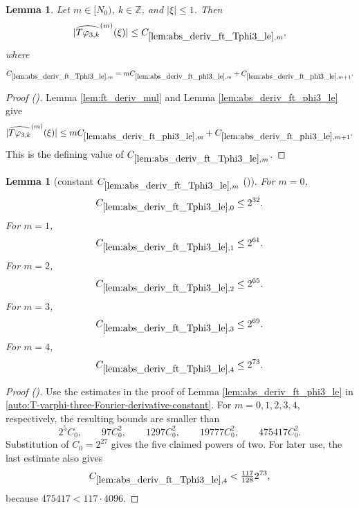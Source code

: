 \documentclass[12pt,reqno]{amsart}
\newcommand{\auto}{{({\tiny\faCar})}}
\theoremstyle{plain}
\newtheorem{lemma}[theorem]{Lemma}
\numberwithin{equation}{section}
\theoremstyle{remark}
\newcommand{\using}[1]{}
\newcommand{\Z}{{\mathbb Z}}
\begin{document}
\begin{lemma}\label{lem:abs_deriv_ft_Tphi3_le}\using{lem:ft_deriv_mul}\using{lem:abs_deriv_ft_phi3_le}
Let $m\in[N_0)$, $k\in\Z$, and $|\xi|\le1$. Then
\begin{equation}\label{auto:T-varphi-three-Fourier-derivative-bound}
|\widehat{T\varphi_{3,k}}^{(m)}(\xi)|
\le C_{\ref{lem:abs_deriv_ft_Tphi3_le},m},
\end{equation}
where
\begin{equation}\label{auto:T-varphi-three-Fourier-derivative-constant}
C_{\ref{lem:abs_deriv_ft_Tphi3_le},m}
=mC_{\ref{lem:abs_deriv_ft_phi3_le},m}
+C_{\ref{lem:abs_deriv_ft_phi3_le},m+1}.
\end{equation}
\end{lemma}
\begin{proof}[Proof \auto]
Lemma \ref{lem:ft_deriv_mul} and Lemma \ref{lem:abs_deriv_ft_phi3_le} give
\[
|\widehat{T\varphi_{3,k}}^{(m)}(\xi)|
\le
mC_{\ref{lem:abs_deriv_ft_phi3_le},m}
+C_{\ref{lem:abs_deriv_ft_phi3_le},m+1}.
\]
This is the defining value of $C_{\ref{lem:abs_deriv_ft_Tphi3_le},m}$.
\end{proof}

\begin{lemma}[constant $C_{\ref{lem:abs_deriv_ft_Tphi3_le},m}$ \auto]\label{constant T phi three derivative}\using{lem:abs_deriv_ft_phi3_le}\using{lem:abs_deriv_ft_Tphi3_le}
For $m=0$,
\begin{equation}\label{constant T phi three derivative bound}
C_{\ref{lem:abs_deriv_ft_Tphi3_le},0}\le2^{32}.
\end{equation}
For $m=1$,
\begin{equation}\label{auto:constant-T-phi-three-derivative-one}
C_{\ref{lem:abs_deriv_ft_Tphi3_le},1}\le2^{61}.
\end{equation}
For $m=2$,
\begin{equation}\label{auto:constant-T-phi-three-derivative-two}
C_{\ref{lem:abs_deriv_ft_Tphi3_le},2}\le2^{65}.
\end{equation}
For $m=3$,
\begin{equation}\label{auto:constant-T-phi-three-derivative-three}
C_{\ref{lem:abs_deriv_ft_Tphi3_le},3}\le2^{69}.
\end{equation}
For $m=4$,
\begin{equation}\label{auto:constant-T-phi-three-derivative-four}
C_{\ref{lem:abs_deriv_ft_Tphi3_le},4}\le2^{73}.
\end{equation}
\end{lemma}
\begin{proof}[Proof \auto]
Use the estimates in the proof of Lemma \ref{lem:abs_deriv_ft_phi3_le} in \eqref{auto:T-varphi-three-Fourier-derivative-constant}. For $m=0,1,2,3,4$, respectively, the resulting bounds are smaller than
\[
2^5C_0,
\qquad
97C_0^2,
\qquad
1297C_0^2,
\qquad
19777C_0^2,
\qquad
475417C_0^2.
\]
Substitution of $C_0=2^{27}$ gives the five claimed powers of two. For later use, the last estimate also gives
\[
C_{\ref{lem:abs_deriv_ft_Tphi3_le},4}
<\tfrac{117}{128}2^{73},
\]
because $475417<117\cdot4096$.
\end{proof}
\end{document}
